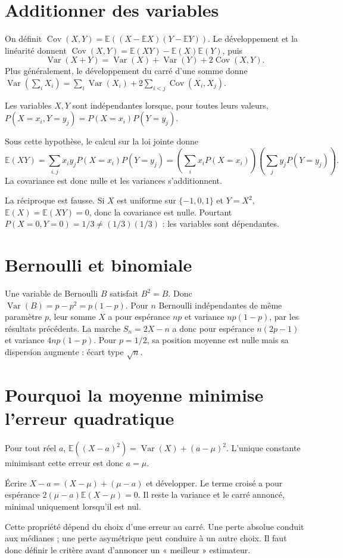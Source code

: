 \documentclass[../cours_1re.tex]{subfiles}
\begin{document}
\section{Additionner des variables}
\approfondissement
On définit
$\operatorname{Cov}(X,Y)=\mathbb E((X-\mathbb E X)(Y-\mathbb E Y))$.
Le développement et la linéarité donnent
$\operatorname{Cov}(X,Y)=\mathbb E(XY)-\mathbb E(X)\mathbb E(Y)$, puis
\[
\operatorname{Var}(X+Y)=\operatorname{Var}(X)+\operatorname{Var}(Y)
+2\operatorname{Cov}(X,Y).
\]
Plus généralement, le développement du carré d'une somme donne
$\operatorname{Var}(\sum_iX_i)=\sum_i\operatorname{Var}(X_i)
+2\sum_{i<j}\operatorname{Cov}(X_i,X_j)$.

Les variables $X,Y$ sont indépendantes lorsque, pour toutes leurs valeurs,
$P(X=x_i,Y=y_j)=P(X=x_i)P(Y=y_j)$.
\begin{demonstration}
Sous cette hypothèse, le calcul sur la loi jointe donne
\[
\mathbb E(XY)=\sum_{i,j}x_iy_jP(X=x_i)P(Y=y_j)
=\left(\sum_i x_iP(X=x_i)\right)\left(\sum_jy_jP(Y=y_j)\right).
\]
La covariance est donc nulle et les variances s'additionnent.
\end{demonstration}
La réciproque est fausse. Si $X$ est uniforme sur $\{-1,0,1\}$ et $Y=X^2$,
$\mathbb E(X)=\mathbb E(XY)=0$, donc la covariance est nulle.
Pourtant $P(X=0,Y=0)=1/3\ne(1/3)(1/3)$ : les variables sont dépendantes.

\section{Bernoulli et binomiale}
Une variable de Bernoulli $B$ satisfait $B^2=B$. Donc
$\operatorname{Var}(B)=p-p^2=p(1-p)$.
Pour $n$ Bernoulli indépendantes de même paramètre $p$, leur somme $X$
a pour espérance $np$ et variance $np(1-p)$, par les résultats précédents.
La marche $S_n=2X-n$ a donc pour espérance $n(2p-1)$ et variance
$4np(1-p)$. Pour $p=1/2$, sa position moyenne est nulle mais sa dispersion
augmente : écart type $\sqrt n$.

\section{Pourquoi la moyenne minimise l'erreur quadratique}
\begin{theoreme}
Pour tout réel $a$,
$\mathbb E((X-a)^2)=\operatorname{Var}(X)+(a-\mu)^2$.
L'unique constante minimisant cette erreur est donc $a=\mu$.
\end{theoreme}
\begin{demonstration}
Écrire $X-a=(X-\mu)+(\mu-a)$ et développer. Le terme croisé a pour
espérance $2(\mu-a)\mathbb E(X-\mu)=0$.
Il reste la variance et le carré annoncé, minimal uniquement lorsqu'il est nul.
\end{demonstration}
Cette propriété dépend du choix d'une erreur au carré. Une perte absolue
conduit aux médianes ; une perte asymétrique peut conduire à un autre choix.
Il faut donc définir le critère avant d'annoncer un « meilleur » estimateur.
\end{document}
